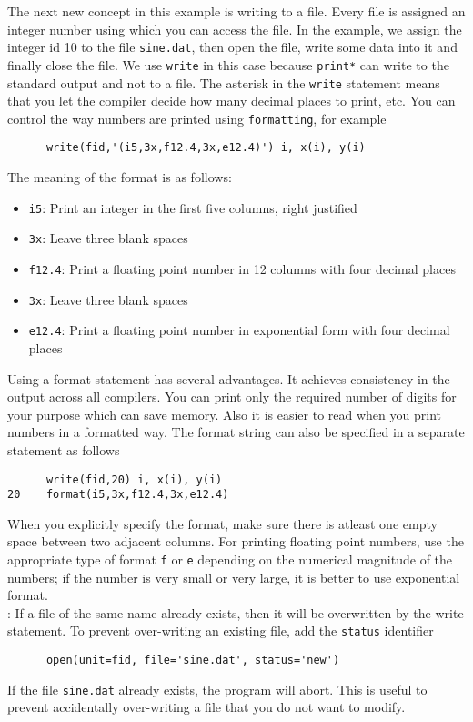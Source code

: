 \documentclass[11pt,oneside]{amsart}
\begin{document}
The next new concept in this example is writing to a file. Every file is assigned an integer number using which you can access the file. In the example, we assign the integer id 10 to the file {\tt sine.dat}, then open the file, write some data into it and finally close the file. We use {\tt write} in this case because {\tt print*} can write to the standard output and not to a file. The asterisk in the {\tt write} statement means that you let the compiler decide how many decimal places to print, etc. You can control the way numbers are printed using {\tt formatting}, for example

\begin{verbatim}
      write(fid,'(i5,3x,f12.4,3x,e12.4)') i, x(i), y(i)
\end{verbatim}
The meaning of the format is as follows:
\begin{itemize}
\item {\tt i5}: Print an integer in the first five columns, right justified
\item {\tt 3x}: Leave three blank spaces
\item {\tt f12.4}: Print a floating point number in 12 columns with four decimal places
\item {\tt 3x}: Leave three blank spaces
\item {\tt e12.4}: Print a floating point number in exponential form with four decimal places
\end{itemize}
Using a format statement has several advantages. It achieves consistency in the output across all compilers. You can print only the required number of digits for your purpose which can save memory. Also it is easier to read when you print numbers in a formatted way. The format string can also be specified in a separate statement as follows
\begin{verbatim}
      write(fid,20) i, x(i), y(i)
20    format(i5,3x,f12.4,3x,e12.4)
\end{verbatim}
When you explicitly specify the format, make sure there is atleast one empty space between two adjacent columns. For printing floating point numbers, use the appropriate type of format {\tt f} or {\tt e} depending on the numerical magnitude of the numbers; if the number is very small or very large, it is better to use exponential format. \\

: If a file of the same name already exists, then it will be overwritten by the write statement. To prevent over-writing an existing file, add the {\tt status} identifier
\begin{verbatim}
      open(unit=fid, file='sine.dat', status='new')
\end{verbatim}
If the file {\tt sine.dat} already exists, the program will abort. This is useful to prevent accidentally over-writing a file that you do not want to modify.
\end{document}
